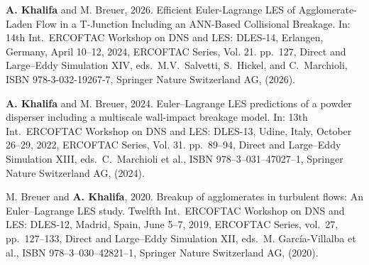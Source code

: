 
\item \textbf{A. Khalifa} and M. Breuer, 2026. Efficient Euler-Lagrange LES of Agglomerate-Laden Flow in a T-Junction Including an ANN-Based Collisional Breakage. In: 14th Int.\ ERCOFTAC Workshop on DNS and LES: DLES-14, Erlangen, Germany, April 10–12, 2024, ERCOFTAC Series, Vol. 21. pp.\ 127, Direct and Large--Eddy Simulation XIV, eds.\ M.V.\ Salvetti, S.\ Hickel, and C.\ Marchioli, ISBN 978-3-032-19267-7, Springer Nature Switzerland AG, (2026).
\item \textbf{A. Khalifa} and M. Breuer, 2024. Euler--Lagrange LES predictions of a powder disperser including a multiscale wall-impact breakage model. In: 13th Int.\ ERCOFTAC Workshop on DNS and LES: DLES-13, Udine, Italy, October 26–29, 2022, ERCOFTAC Series, Vol. 31. pp.\ 89--94, Direct and Large--Eddy Simulation XIII, eds.\ C.\ Marchioli et al., ISBN 978--3--031--47027--1, Springer Nature Switzerland AG, (2024). 
\item M. Breuer and \textbf{A. Khalifa}, 2020. Breakup of agglomerates in turbulent flows: An Euler--Lagrange LES study. Twelfth Int.\ ERCOFTAC Workshop on DNS and LES: DLES-12, Madrid, Spain, June 5--7, 2019, ERCOFTAC Series, vol.\ {27}, pp.\ 127--133, Direct and Large--Eddy Simulation XII, eds.\ M. Garc\'ia-Villalba et al., ISBN 978--3--030--42821--1, Springer Nature Switzerland AG, (2020). 
